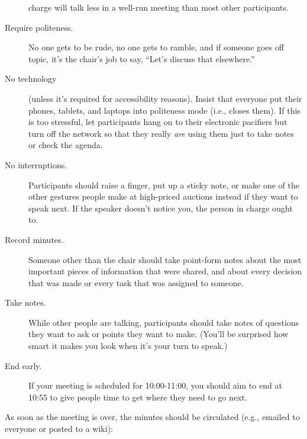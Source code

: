 \begin{description}
charge will talk less in a well-run meeting than most other
participants.
\item[Require politeness.]
No one gets to be rude, no one gets to ramble, and if someone goes
off topic, it's the chair's job to say, ``Let's discuss that
elsewhere.''
\item[No technology]
(unless it's required for accessibility reasons). Insist that
everyone put their phones, tablets, and laptops into politeness mode
(i.e., closes them). If this is too stressful, let participants hang
on to their electronic pacifiers but turn off the network so that
they really \emph{are} using them just to take notes or check the agenda.
\item[No interruptions.]
Participants should raise a finger, put up a sticky note, or make
one of the other gestures people make at high-priced auctions
instead if they want to speak next. If the speaker doesn't notice
you, the person in charge ought to.
\item[Record minutes.]
Someone other than the chair should take point-form notes about the
most important pieces of information that were shared, and about
every decision that was made or every task that was assigned to
someone.
\item[Take notes.]
While other people are talking, participants should take notes of
questions they want to ask or points they want to make. (You'll be
surprised how smart it makes you look when it's your turn to speak.)
\item[End early.]
If your meeting is scheduled for 10:00-11:00, you should aim to end
at 10:55 to give people time to get where they need to go next.
\end{description}

As soon as the meeting is over, the minutes should be circulated (e.g.,
emailed to everyone or posted to a wiki):

